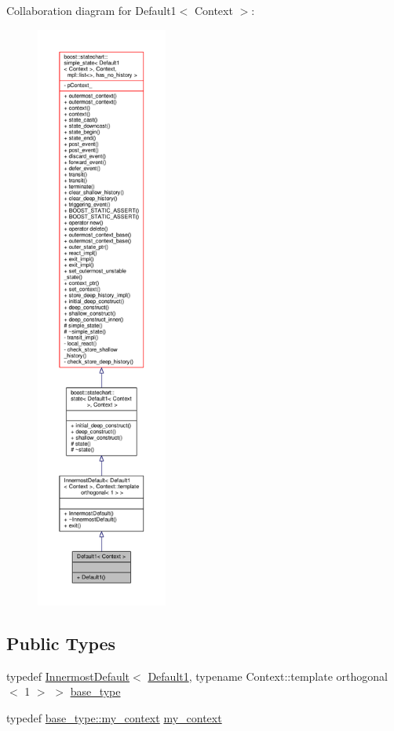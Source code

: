 Collaboration diagram for Default1$<$ Context $>$\+:
\nopagebreak
\begin{figure}[H]
\begin{center}
\leavevmode
\includegraphics[height=550pt]{struct_default1__coll__graph}
\end{center}
\end{figure}
\subsection*{Public Types}
\begin{DoxyCompactItemize}
\item 
typedef \mbox{\hyperlink{struct_innermost_default}{Innermost\+Default}}$<$ \mbox{\hyperlink{struct_default1}{Default1}}, typename Context\+::template orthogonal$<$ 1 $>$ $>$ \mbox{\hyperlink{struct_default1_a763f778f35926579e387cf8e145542ba}{base\+\_\+type}}
\item 
typedef \mbox{\hyperlink{struct_innermost_default_a0aab337364dec3101e80f293b709d53d}{base\+\_\+type\+::my\+\_\+context}} \mbox{\hyperlink{struct_default1_a92f8ed76bf3688622a87155b17e4fccf}{my\+\_\+context}}
\end{DoxyCompactItemize}

